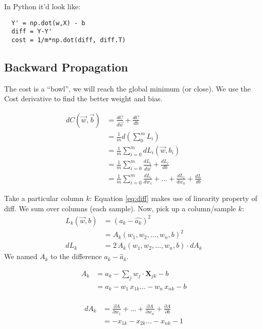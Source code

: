 In Python it'd look like:
\begin{center}
  \begin{BVerbatim}
  Y' = np.dot(w,X) - b
  diff = Y-Y' 
  cost = 1/m*np.dot(diff, diff.T)
  \end{BVerbatim}
\end{center}
\subsection{Backward Propagation}

The cost is a ``bowl'', we will reach the global minimum (or close).
We use the Cost derivative to find the better weight and bias. 

\begin{align}
  dC(\vec{w}, \vec{b}) &= \frac{dC}{d\vec{w}} + \frac{dC}{db}\nonumber\\
  &= \frac{1}{m} d(\sum^m_0 L_i)\nonumber\\
  &= \frac{1}{m} \sum^m_{i=0} dL_i(\vec{w}, b_i)\label{eq:diff}\\
  &= \frac{1}{m} \sum^m_{i=0} \frac{dL_i}{d\vec{w}} + \frac{dL_i}{db}\nonumber\\
  &= \frac{1}{m} \sum^m_{i=0} \frac{dL_i}{dw_1} +\ldots +\frac{dL_i}{dw_n} + \frac{dL}{db} \nonumber
\end{align}

Take a particular column $k$:
Equation \ref{eq:diff} makes use of linearity property of diff. We sum over columns (each sample). Now, pick up a column/sample $k$:
\begin{align*}
  L_k(\vec{w},b) &= (a_k - \hat{a_k})^2\\
    &= A_k(w_1, w_2,\ldots, w_n, b)^2\\
  dL_k &= 2\,A_k(w_1,w_2,\ldots, w_n, b)\cdot{}dA_k
\end{align*}
We named $A_k$ to the difference $a_k-\hat{a}_k$.

\begin{align*}
  A_k  &= a_k - \sum_j w_j\cdot{}\mathbf{X}_{jk} - b \\
  &= a_k - w_1\,x_{1k} \ldots{}-w_n\,x_{nk} - b \\
\end{align*}

\begin{align}
  dA_k &= \frac{\partial A}{\partial w_1}+ \ldots + \frac{\partial A}{\partial w_n}+ \frac{\partial A}{\partial b} \nonumber\\
  &=  -x_{1k} -x_{2k} \ldots - x_{nk} -1 \label{dA}
\end{align}

